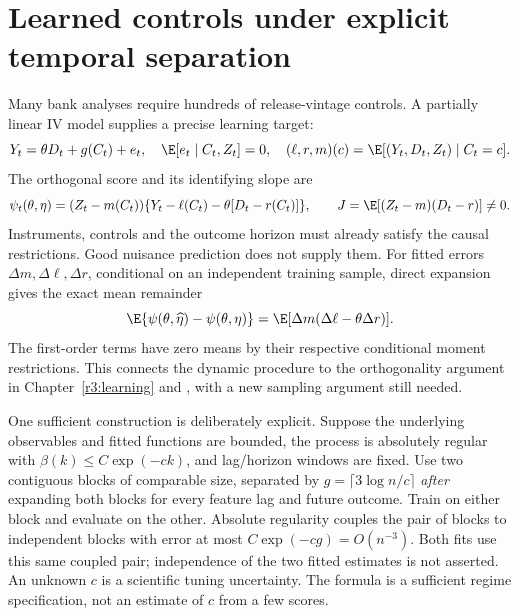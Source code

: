 \section{Learned controls under explicit temporal separation}
\label{s4:dependent-learning}
Many bank analyses require hundreds of release-vintage controls. A
partially linear IV model supplies a precise learning target:
\[
 Y_t=\theta D_t+g(C_t)+e_t,\quad
 \E[e_t\mid C_t,Z_t]=0,\quad
 (\ell,r,m)(c)=\E[(Y_t,D_t,Z_t)\mid C_t=c].
\]
The orthogonal score and its identifying slope are
\[
 \psi_t(\theta,\eta)=(Z_t-m(C_t))
  \{Y_t-\ell(C_t)-\theta[D_t-r(C_t)]\},\qquad
 J=\E[(Z_t-m)(D_t-r)]\ne0.
\]
Instruments, controls and the outcome horizon must already satisfy the
causal restrictions. Good nuisance prediction does not supply them.
For fitted errors $\Delta m,\Delta\ell,\Delta r$, conditional on an
independent training sample, direct expansion gives the exact mean remainder
\begin{equation}
 \E\{\psi(\theta,\widehat\eta)-\psi(\theta,\eta)\}
 =\E[\Delta m(\Delta\ell-\theta\Delta r)].
 \label{s4:dependent-remainder}
\end{equation}
The first-order terms have zero means by their respective conditional
moment restrictions. This connects the dynamic procedure to the
orthogonality argument in Chapter~\ref{r3:learning} and
\citet{dml2018}, with a new sampling argument still needed.

One sufficient construction is deliberately explicit. Suppose the underlying
observables and fitted functions are bounded, the process is absolutely
regular with $\beta(k)\le C\exp(-ck)$, and lag/horizon windows are fixed.
Use two contiguous blocks of comparable size, separated by
$g=\lceil3\log n/c\rceil$ \emph{after} expanding both blocks for every
feature lag and future outcome. Train on either block and evaluate on the
other. Absolute regularity couples the pair of blocks to independent
blocks with error at most $C\exp(-cg)=O(n^{-3})$. Both fits use this
same coupled pair; independence of the two fitted estimates is not asserted.
An unknown $c$ is a scientific tuning uncertainty. The formula is a
sufficient regime specification, not an estimate of $c$ from a few scores.

